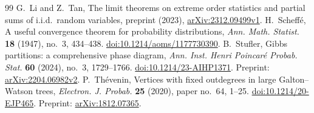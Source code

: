 \begin{thebibliography}{99}
 G.~Li and Z.~Tan, The limit theorems on extreme order statistics and partial sums of i.i.d.\ random variables, preprint (2023), \href{https://arxiv.org/abs/2312.09499v1}{arXiv:2312.09499v1}.
 H.~Scheff\'e, A useful convergence theorem for probability distributions, \emph{Ann. Math. Statist.} \textbf{18} (1947), no.~3, 434--438. \href{https://doi.org/10.1214/aoms/1177730390}{doi:10.1214/aoms/1177730390}.
 B.~Stufler, Gibbs partitions: a comprehensive phase diagram, \emph{Ann. Inst. Henri Poincar\'e Probab. Stat.} \textbf{60} (2024), no.~3, 1729--1766. \href{https://doi.org/10.1214/23-AIHP1371}{doi:10.1214/23-AIHP1371}. Preprint: \href{https://arxiv.org/abs/2204.06982}{arXiv:2204.06982v2}.
 P.~Th\'evenin, Vertices with fixed outdegrees in large Galton--Watson trees, \emph{Electron. J. Probab.} \textbf{25} (2020), paper no.~64, 1--25. \href{https://doi.org/10.1214/20-EJP465}{doi:10.1214/20-EJP465}. Preprint: \href{https://arxiv.org/abs/1812.07365}{arXiv:1812.07365}.
\end{thebibliography}
